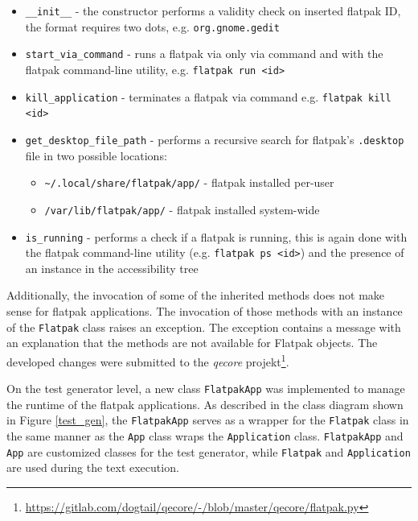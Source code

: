 \begin{itemize} 
    \item \texttt{\_\_init\_\_} - the constructor performs a validity check on inserted flatpak ID, the format requires two dots, e.g. \texttt{org.gnome.gedit}
    \item \texttt{start\_via\_command} - runs a flatpak via only via command and with the flatpak command-line utility, e.g. \texttt{flatpak run <id>}
    \item \texttt{kill\_application} - terminates a flatpak via command e.g. \texttt{flatpak kill <id>}
    \item \texttt{get\_desktop\_file\_path} - performs a recursive search for flatpak's \texttt{.desktop} file in two possible locations:
    \begin{itemize}
        \item \texttt{\textasciitilde/.local/share/flatpak/app/} - flatpak installed per-user
        \item \texttt{/var/lib/flatpak/app/} - flatpak installed system-wide
    \end{itemize} 
    \item \texttt{is\_running} - performs a check if a flatpak is running, this is again done with the flatpak command-line utility (e.g. \texttt{flatpak ps <id>}) and the presence of an instance in the accessibility tree
\end{itemize}

Additionally, the invocation of some of the inherited methods does not make sense for flatpak applications. The invocation of those methods with an instance of the \texttt{Flatpak} class raises an exception. The exception contains a message with an explanation that the methods are not available for Flatpak objects. The developed changes were submitted to the \textit{qecore} projekt{\footnote{\url{https://gitlab.com/dogtail/qecore/-/blob/master/qecore/flatpak.py}}}.

On the test generator level, a new class \texttt{FlatpakApp} was implemented to manage the runtime of the flatpak applications. As described in the class diagram shown in Figure \ref{test_gen}, the \texttt{FlatpakApp} serves as a wrapper for the \texttt{Flatpak} class in the same manner as the \texttt{App} class wraps the \texttt{Application} class. \texttt{FlatpakApp} and \texttt{App} are customized classes for the test generator, while \texttt{Flatpak} and \texttt{Application} are used during the text execution. 

